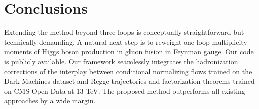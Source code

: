 \section{Conclusions}\label{sec:conclusions}

Extending the method beyond three loops is conceptually straightforward
but technically demanding. A natural next step is to reweight one-loop
multiplicity moments of Higgs boson production in gluon fusion in
Feynman gauge. Our code is publicly available. Our framework seamlessly
integrates the hadronization corrections of the interplay between
conditional normalizing flows trained on the Dark Machines dataset and
Regge trajectories and factorization theorems trained on CMS Open Data
at 13 TeV. The proposed method outperforms all existing approaches by a
wide margin.

